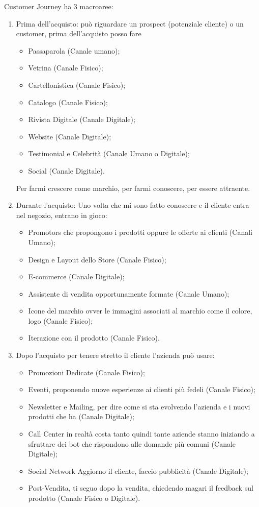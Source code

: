 \documentclass[11pt]{article}
\begin{document}
Customer Journey ha 3 macroaree:
\begin{enumerate}[noitemsep,topsep=0ex]
	\item Prima dell'acquisto: può riguardare un prospect (potenziale cliente) o un customer, prima dell'acquisto posso fare
	\begin{itemize}[noitemsep,topsep=0ex]
		\item Passaparola (Canale umano);
		\item Vetrina (Canale Fisico);
		\item Cartellonistica (Canale Fisico);
		\item Catalogo (Canale Fisico);
		\item Rivista Digitale (Canale Digitale);
		\item Website (Canale Digitale);
		\item Testimonial e Celebrità (Canale Umano o Digitale);
		\item Social (Canale Digitale).
	\end{itemize}
	Per farmi crescere come marchio, per farmi conoscere, per essere attraente.
	
	\item Durante l'acquisto: Uno volta che mi sono fatto conoscere e il cliente entra nel negozio, entrano in gioco:
	\begin{itemize}[noitemsep,topsep=0ex]
		\item Promotors che propongono i prodotti oppure le offerte ai clienti (Canali Umano); 
		\item Design e Layout dello Store (Canale Fisico); 
		\item E-commerce (Canale Digitale); 
		\item Assistente di vendita opportunamente formate (Canale Umano);
		\item Icone del marchio ovver le immagini associati al marchio come il colore, logo (Canale Fisico);
		\item Iterazione con il prodotto (Canale Fisico).
	\end{itemize} 
	
	\item Dopo l'acquisto per tenere stretto il cliente l'azienda può usare: 
	\begin{itemize}[noitemsep,topsep=0ex]
		\item Promozioni Dedicate (Canale Fisico); 
		\item Eventi, proponendo nuove esperienze ai clienti più fedeli (Canale Fisico); 
		\item Newsletter e Mailing, per dire come si sta evolvendo l'azienda e i nuovi prodotti che ha (Canale Digitale);
		\item Call Center in realtà costa tanto quindi tante aziende stanno iniziando a sfruttare dei bot che rispondono alle domande più comuni (Canale Digitale);
		\item Social Network Aggiorno il cliente, faccio pubblicità (Canale Digitale); 
		\item Post-Vendita, ti seguo dopo la vendita, chiedendo magari il feedback sul prodotto (Canale Fisico o Digitale).
	\end{itemize}
\end{enumerate}
\end{document}
